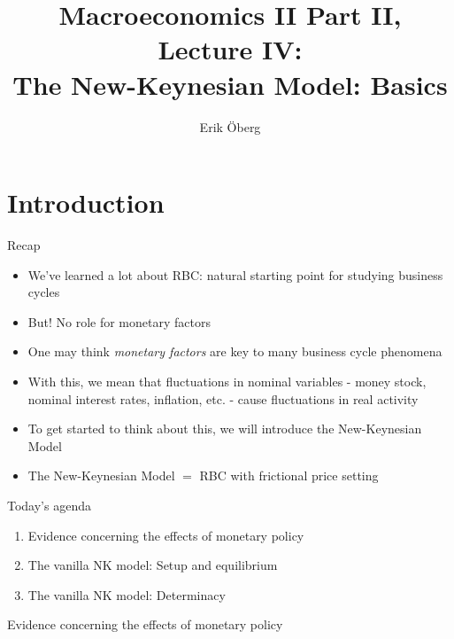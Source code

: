 \documentclass[9pt,xcolor={dvipsnames}]{beamer}
\title[NK: Basics]{Macroeconomics II Part II, Lecture IV:\\
	  The New-Keynesian Model: Basics}
\author{Erik {\"O}berg}
\date{}
\newcommand{\bit}{\begin{itemize}}
\newcommand{\eit}{\end{itemize}}
\newcommand{\ben}{\begin{enumerate}}
\newcommand{\een}{\end{enumerate}}
\newcommand{\bc}{\color{blue}}
\begin{document}
\begin{frame}
\maketitle
\end{frame}

\section{Introduction}

\begin{frame}{Recap}

\bit
\setlength\itemsep{1.5em} 

\item We've learned a lot about RBC: natural starting point for studying business cycles 

\item But! No role for monetary factors

\item One may think \emph{monetary factors} are key to many business cycle phenomena

\item With this, we mean that fluctuations in nominal variables - money stock, nominal interest rates, inflation, etc. - cause fluctuations in real activity 

\item To get started to think about this, we will introduce the {\bc New-Keynesian Model} 

\item The New-Keynesian Model $=$ RBC with frictional price setting

\eit

\end{frame}

\begin{frame}{Today's agenda}

\ben
\setlength\itemsep{1.5em} 

\item Evidence concerning the effects of monetary policy

\item The vanilla NK model: Setup and equilibrium

\item The vanilla NK model: Determinacy

\een

\end{frame}


\begin{frame}

\begin{center}
	\huge Evidence concerning the effects of monetary policy \normalfont
\end{center}

\end{frame}
\end{document}
